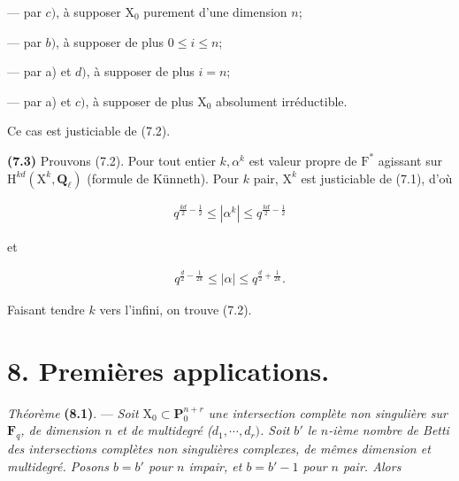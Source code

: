 \documentclass[10pt,leqno]{article}
\begin{document}
\noindent — par \(c)\), à supposer \(\mathrm{X}_{0}\) purement d’une dimension \(n\);\par

\noindent — par \(b)\), à supposer de plus \(0\leq i\leq n\);\par

\noindent — par a) et \(d)\), à supposer de plus \(i=n\);\par

\noindent — par a) et \(c)\), à supposer de plus \(\mathrm{X}_{0}\) absolument irréductible.\par

\noindent Ce cas est justiciable de (7.2).\par

\noindent \textbf{(7.3)} Prouvons (7.2). Pour tout entier \(k, \alpha ^{k}\) est valeur propre de \(\mathrm{F}^{*}\) agissant sur \(\mathrm{H}^{kd}(\mathrm{X}^{k},\mathbf{Q}_{\ell })\) (formule de Künneth). Pour \(k\) pair, \(\mathrm{X}^{k}\) est justiciable de (7.1), d’où\par

\begin{equation*}\begin{gathered}q^{\frac{kd}{2}- \frac{1}{2}} \leq  |\alpha ^{k}| \leq  q^{\frac{kd}{2}- \frac{1}{2}}\end{gathered}\end{equation*}

\noindent et\par

\begin{equation*}\begin{gathered}q^{\frac{d}{2}- \frac{1}{2k}} \leq  |\alpha | \leq  q^{\frac{d}{2}+\frac{1}{2k}}.\end{gathered}\end{equation*}

\noindent Faisant tendre \(k\) vers l’infini, on trouve (7.2).\par

\section*{8. Premières applications.}

\noindent \emph{Théorème} \textbf{(8.1)}. — {\itshape Soit \(\mathrm{X}_{0}\subset \mathbf{P}_{0}^{n+r}\) une intersection complète non singulière sur \(\mathbf{F}_{q}\), de dimension \(n\) et de multidegré (\(d_{1},\cdots ,d_{r})\). Soit \(b'\) le \(n\)-ième nombre de Betti des intersections complètes non singulières complexes, de mêmes dimension et multidegré. Posons \(b=b'\) pour \(n\) impair, et \(b=b'- 1\) pour \(n\) pair. Alors}\par
\end{document}

